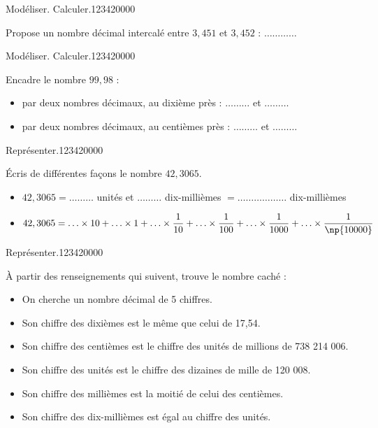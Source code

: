 \begin{pageParcoursd} 


\begin{ExoCd}{Modéliser. Calculer.}{1234}{2}{0}{0}{0}{0}

Propose un nombre décimal intercalé entre $3,451$ et $3,452$ : $\ldots \ldots\ldots \ldots$

\end{ExoCd}

\begin{ExoCd}{Modéliser. Calculer.}{1234}{2}{0}{0}{0}{0}

Encadre le nombre $99,98$ :
\begin{itemize}
\item par deux nombres décimaux, au dixième près : $\ldots\ldots\ldots$ et $\ldots\ldots\ldots$ \vspace{0.3cm}
\item par deux nombres décimaux, au centièmes près : $\ldots\ldots\ldots$ et $\ldots\ldots\ldots$
\end{itemize}
 
\end{ExoCd}

\begin{ExoCd}{Représenter.}{1234}{2}{0}{0}{0}{0}

Écris de différentes façons le nombre $42,3065$.

\begin{itemize}
\item $42,3065 = \ldots\ldots\ldots$ unités et $\ldots\ldots\ldots$ dix-millièmes   $ = \ldots\ldots\ldots \ldots\ldots\ldots$ dix-millièmes\vspace{0.3cm}
\item $42,3065 = \ldots\times 10 + \ldots\times 1 + \ldots\times \dfrac{1}{10} +  \ldots\times \dfrac{1}{100} +  \ldots\times \dfrac{1}{1000} + \ldots\times \dfrac{1}{\np{10000}}$ \vspace{0.3cm}
\end{itemize}


 
\end{ExoCd}

\begin{ExoCd}{Représenter.}{1234}{2}{0}{0}{0}{0}

À partir des renseignements qui suivent, trouve le nombre caché :

\begin{itemize}
\item  On cherche un nombre décimal de 5 chiffres.
\item  Son chiffre des dixièmes est le même que celui de 17,54.
\item  Son chiffre des centièmes est le chiffre des unités de millions de 738 214 006.
\item  Son chiffre des unités est le chiffre des dizaines de mille de 120 008.
\item  Son chiffre des millièmes est la moitié de celui des centièmes.
\item  Son chiffre des dix-millièmes est égal au chiffre des unités.
\end{itemize}


\end{ExoCd}
\end{pageParcoursd}
